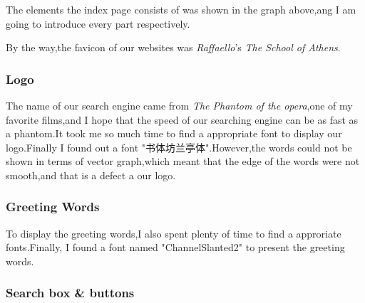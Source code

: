 \documentclass[10pt,twoside,a4paper,titlepage]{article}
\begin{document}
	The elements the index page consists of was shown in the graph above,ang I am going to introduce every part respectively.
	
	By the way,the favicon of our websites was \emph{Raffaello}'s \emph{The School of Athens}.
	
	\subsubsection{Logo}
	
	The name of our search engine came from \emph{The Phantom of the opera},one of my favorite films,and I hope that the speed of our searching engine can be as fast as a phantom.It took me so much time to find a appropriate font to display our logo.Finally I found out a font "书体坊兰亭体".However,the words could not be shown in terms of vector graph,which meant that the edge of the words were not smooth,and that is a defect a our logo.
	
	\subsubsection{Greeting Words}
	
	To display the greeting words,I also spent plenty of time to find a approriate fonts.Finally, I found a font named "ChannelSlanted2" to present the greeting words.
	
	\subsubsection{Search box \& buttons}
	
\end{document}
